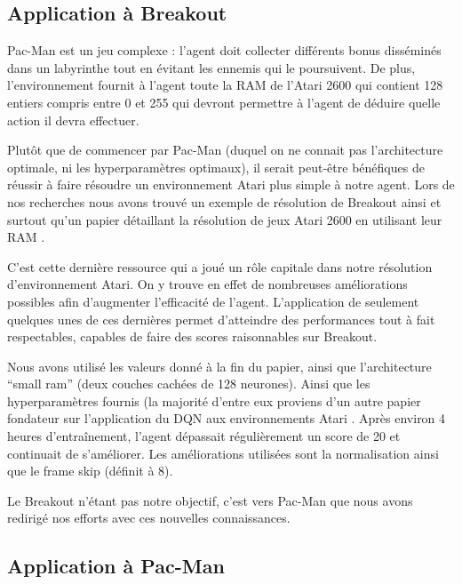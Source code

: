 \subsection{Application à Breakout}
Pac-Man est un jeu complexe : l'agent doit collecter différents bonus disséminés dans un labyrinthe tout en évitant les ennemis qui le poursuivent. De plus, l'environnement fournit à l'agent toute la RAM de l'Atari 2600 qui contient 128 entiers compris entre 0 et 255 qui devront permettre à l'agent de déduire quelle action il devra effectuer.
\par
Plutôt que de commencer par Pac-Man (duquel on ne connait pas l'architecture optimale, ni les hyperparamètres optimaux), il serait peut-être bénéfiques de réussir à faire résoudre un environnement Atari plus simple à notre agent. Lors de nos recherches nous avons trouvé un exemple de résolution de Breakout ainsi et surtout qu'un papier détaillant la résolution de jeux Atari 2600 en utilisant leur RAM \cite{breakout_tkgw, learn_atari_ram}.
\par
C'est cette dernière ressource qui a joué un rôle capitale dans notre résolution d'environnement Atari. On y trouve en effet de nombreuses améliorations possibles afin d'augmenter l'efficacité de l'agent. L'application de seulement quelques unes de ces dernières permet d'atteindre des performances tout à fait respectables, capables de faire des scores raisonnables sur Breakout.
\par
Nous avons utilisé les valeurs donné à la fin du papier, ainsi que l'architecture ``small ram'' (deux couches cachées de 128 neurones). Ainsi que les hyperparamètres fournis (la majorité d'entre eux proviens d'un autre papier fondateur sur l'application du DQN aux environnements Atari \cite{atari_drl}. Après environ 4 heures d'entraînement, l'agent dépassait régulièrement un score de 20 et continuait de s'améliorer. Les améliorations utilisées sont la normalisation ainsi que le frame skip (définit à 8).
\par
Le Breakout n'étant pas notre objectif, c'est vers Pac-Man que nous avons redirigé nos efforts avec ces nouvelles connaissances.


\subsection{Application à Pac-Man}

